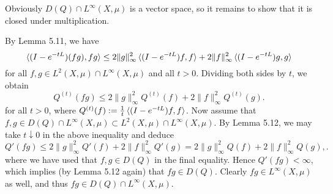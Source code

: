 Obviously $D(Q)\cap L^\infty(X,\mu)$ is a vector space, so it remains to show that it is closed under multiplication.

By Lemma 5.11, we have
\begin{equation*}
	\braket{(I-e^{-tL})(fg), fg} \le 2\|g\|^2_\infty \braket{(I-e^{-tL})f,f} + 2\|f\|^2_\infty \braket{(I-e^{-tL})g,g}
\end{equation*}
for all $f,g\in L^2(X,\mu)\cap L^\infty(X,\mu)$ and all $t>0$. Dividing both sides by $t$, we obtain
\begin{equation}
	Q^{(t)}(fg) \le 2\|g\|^2_\infty Q^{(t)}(f) + 2\|f\|^2_\infty Q^{(t)}(g).
\end{equation}
for all $t>0$, where $Q^{(t)}(f) := \frac{1}{t}\braket{(I-e^{-tL})f,f}$. Now assume that $f, g\in D(Q)\cap L^\infty(X,\mu) \subset L^2(X,\mu)\cap L^\infty(X,\mu)$. By Lemma 5.12, we may take $t\downarrow 0$ in the above inequality and deduce
\begin{equation*}
	Q'(fg) \le 2\|g\|^2_\infty Q'(f) + 2\|f\|^2_\infty Q'(g) = 2\|g\|^2_\infty Q(f) + 2\|f\|^2_\infty Q(g),.
\end{equation*}
where we have used that $f, g\in D(Q)$ in the final equality. Hence $Q'(fg)<\infty$, which implies (by Lemma 5.12 again) that $fg\in D(Q)$. Clearly $fg\in L^\infty(X,\mu)$ as well, and thus $fg \in D(Q)\cap L^\infty(X,\mu)$.